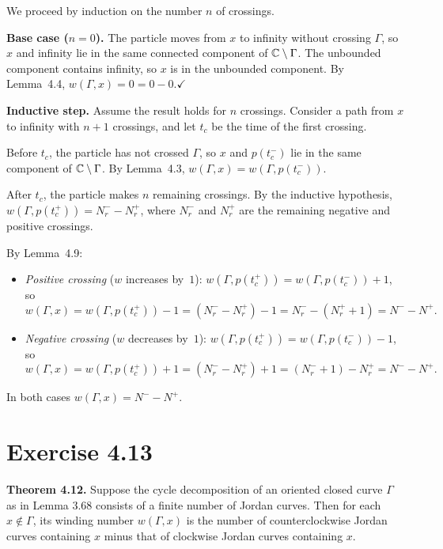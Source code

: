 \documentclass{article}
\begin{document}
\begin{solution}
  We proceed by induction on the number $n$ of crossings.

  \textbf{Base case ($n = 0$).}\;
  The particle moves from $x$ to infinity without crossing $\Gamma$,
  so $x$ and infinity lie in the same connected component of
  $\mathbb{C} \setminus \Gamma$.  The unbounded component contains infinity,
  so $x$ is in the unbounded component.  By Lemma~4.4,
  $w(\Gamma, x) = 0 = 0 - 0$.\quad$\checkmark$

  \textbf{Inductive step.}\;
  Assume the result holds for $n$ crossings.
  Consider a path from $x$ to infinity with $n + 1$ crossings,
  and let $t_c$ be the time of the first crossing.

  Before $t_c$, the particle has not crossed $\Gamma$, so $x$ and
  $p(t_c^-)$ lie in the same component of $\mathbb{C} \setminus \Gamma$.
  By Lemma~4.3, $w(\Gamma, x) = w(\Gamma, p(t_c^-))$.

  After $t_c$, the particle makes $n$ remaining crossings.
  By the inductive hypothesis,
  $w(\Gamma, p(t_c^+)) = N_r^- - N_r^+$,
  where $N_r^-$ and $N_r^+$ are the remaining negative and positive
  crossings.

  By Lemma~4.9:
  \begin{itemize}
    \item \textit{Positive crossing} ($w$ increases by~$1$):
      $w(\Gamma, p(t_c^+)) = w(\Gamma, p(t_c^-)) + 1$, so
      \[
        w(\Gamma, x) = w(\Gamma, p(t_c^+)) - 1
        = (N_r^- - N_r^+) - 1
        = N_r^- - (N_r^+ + 1)
        = N^- - N^+.
      \]
    \item \textit{Negative crossing} ($w$ decreases by~$1$):
      $w(\Gamma, p(t_c^+)) = w(\Gamma, p(t_c^-)) - 1$, so
      \[
        w(\Gamma, x) = w(\Gamma, p(t_c^+)) + 1
        = (N_r^- - N_r^+) + 1
        = (N_r^- + 1) - N_r^+
        = N^- - N^+.
      \]
  \end{itemize}
  In both cases $w(\Gamma, x) = N^- - N^+$.\qedhere
\end{solution}

\section{Exercise 4.13}

\textbf{Theorem 4.12.}
Suppose the cycle decomposition of an oriented closed curve $\Gamma$
as in Lemma 3.68 consists of a finite number of Jordan curves.
Then for each $x \notin \Gamma$, its winding number $w(\Gamma, x)$ is
the number of counterclockwise Jordan curves containing $x$ minus that
of clockwise Jordan curves containing $x$.
\end{document}
